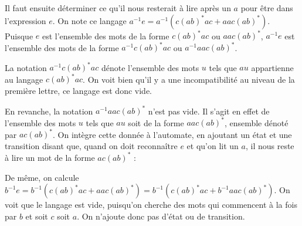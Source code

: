 \begin{example}
Il faut ensuite déterminer ce qu'il nous resterait à lire après un $a$ pour être dans l'expression $e$. On note ce langage $a^{-1}e = a^{-1}(c(ab)^*ac + aac(ab)^*)$.
Puisque $e$ est l'ensemble des mots de la forme $c(ab)^*ac$ ou $aac(ab)^*$, $a^{-1}e$ est l'ensemble des mots de la forme $a^{-1}c(ab)^*ac$ ou $a^{-1}aac(ab)^*$.

La notation $a^{-1}c(ab)^*ac$ dénote l'ensemble des mots $u$ tels que $au$ appartienne au langage $c(ab)^*ac$. On voit bien qu'il y a une incompatibilité au niveau de la première lettre, ce langage est donc vide.

En revanche, la notation $a^{-1}aac(ab)^*$ n'est pas vide. Il s'agit en effet de l'ensemble des mots $u$ tels que $au$ soit de la forme $aac(ab)^*$, ensemble dénoté par $ac(ab)^*$. On intègre cette donnée à l'automate, en ajoutant un état et une transition disant que, quand on doit reconnaître $e$ et qu'on lit un $a$, il nous reste à lire un mot de la forme $ac(ab)^*$ :



\begin{figure}[H]
\centering

\end{figure}

De même, on calcule $b^{-1}e = b^{-1}(c(ab)^*ac + aac(ab)^*) = b^{-1}(c(ab)^*ac + b^{-1}aac(ab)^*)$. On voit que le langage est vide, puisqu'on cherche des mots qui commencent à la fois par $b$ et soit $c$ soit $a$. On n'ajoute donc pas d'état ou de transition.


\end{example}
